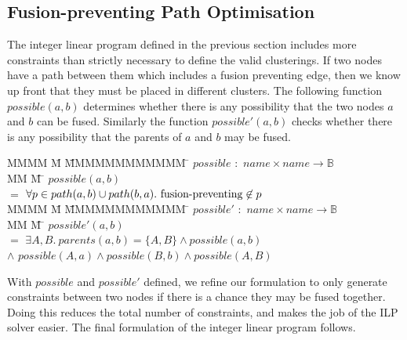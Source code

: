 \subsection{Fusion-preventing Path Optimisation}
\label{s:OptimisedConstraints}
The integer linear program defined in the previous section includes more constraints than strictly necessary to define the valid clusterings. If two nodes have a path between them which includes a fusion preventing edge, then we know up front that they must be placed in different clusters. The following function $possible(a,b)$ determines whether there is any possibility that the two nodes $a$ and $b$ can be fused. Similarly the function $possible'(a, b)$ checks whether there is any possibility that the parents of $a$ and $b$ may be fused.
\begin{tabbing}
MMMM \= M \=     \= MMMMMMMMMMMM    \=  \kill
$possible$ \> $:$     \> $name \times name \to \mathbb{B}$      \\
MM        \= M    \= \kill
$possible(a,b)$ \\
    \>$=$  \>$\forall p \in path(a,b) \cup path(b,a).\ \fusionpreventing \not\in p$
\\[1ex]
MMMM \= M \=     \= MMMMMMMMMMMM    \=  \kill
$possible'$     \> $:$ \> $name \times name \to \mathbb{B}$      \\
MM        \= M    \= \kill
$possible'(a,b)$ \\
    \>$=$   \>$\exists A, B.\  parents(a,b) = \{A,B\} \wedge possible(a,b)$ \\
    \>$\wedge$ \> $possible(A,a) \wedge possible(B,b) \wedge possible(A,B)$
\end{tabbing}
With $possible$ and $possible'$ defined, we refine our formulation to only generate constraints between two nodes if there is a chance they may be fused together. Doing this reduces the total number of constraints, and makes the job of the ILP solver easier. The final formulation of the integer linear program follows.

